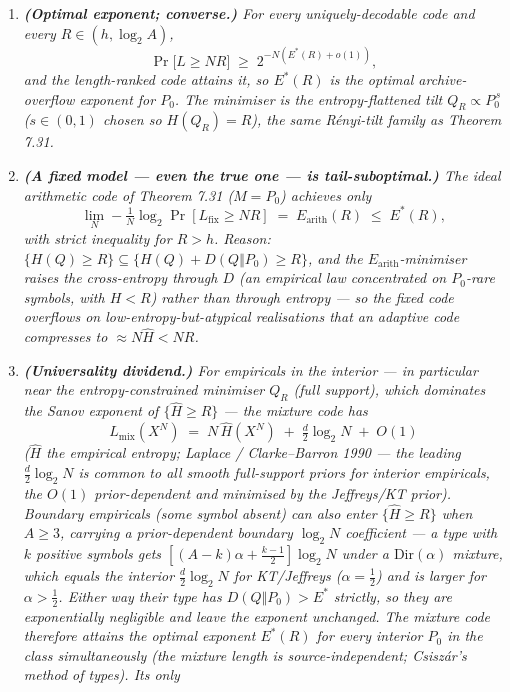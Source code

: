 \documentclass[
]{article}
\begin{document}
\begin{enumerate}
\item \emph{\textbf{(Optimal exponent; converse.)} For every uniquely-decodable code
and every $R\in(h,\log_2 A)$,}
\[
  \Pr\bigl[L\ge NR\bigr]\;\ge\;2^{-N(E^\ast(R)+o(1))},
\]
\emph{and the length-ranked code attains it, so $E^\ast(R)$ is the \emph{optimal}
archive-overflow exponent for $P_0$. The minimiser is the entropy-flattened tilt
$Q_R\propto P_0^{\,s}$ ($s\in(0,1)$ chosen so $H(Q_R)=R$), the same R\'enyi-tilt
family as Theorem 7.31.}
\item \emph{\textbf{(A fixed model --- even the true one --- is tail-suboptimal.)}
The ideal arithmetic code of Theorem 7.31 ($M=P_0$) achieves only}
\[
  \lim_N -\tfrac1N\log_2\Pr[L_{\mathrm{fix}}\ge NR]\;=\;E_{\mathrm{arith}}(R)\;\le\;E^\ast(R),
\]
\emph{with \emph{strict} inequality for $R>h$. Reason: $\{H(Q)\ge R\}\subseteq
\{H(Q)+D(Q\Vert P_0)\ge R\}$, and the $E_{\mathrm{arith}}$-minimiser raises the
cross-entropy through $D$ (an empirical law concentrated on $P_0$-\emph{rare}
symbols, with $H<R$) rather than through entropy --- so the fixed code overflows on
low-entropy-but-atypical realisations that an adaptive code compresses to
$\approx N\widehat H<NR$.}
\item \emph{\textbf{(Universality dividend.)} For empiricals in the interior --- in
particular near the entropy-constrained minimiser $Q_R$ (full support), which
\emph{dominates the Sanov exponent} of $\{\widehat H\ge R\}$ --- the mixture code has}
\[
  L_{\mathrm{mix}}(X^N)\;=\;N\,\widehat H(X^N)\;+\;\tfrac d2\log_2 N\;+\;O(1)
\]
\emph{($\widehat H$ the empirical entropy; Laplace / Clarke--Barron 1990 --- the
leading $\tfrac d2\log_2 N$ is common to all smooth full-support priors for interior
empiricals, the $O(1)$ prior-dependent and minimised by the Jeffreys/KT prior).
Boundary empiricals (some symbol absent) \emph{can} also enter $\{\widehat H\ge R\}$
when $A\ge3$, carrying a prior-dependent boundary $\log_2 N$ coefficient --- a type
with $k$ positive symbols gets $[(A-k)\alpha+\tfrac{k-1}2]\log_2 N$ under a
$\mathrm{Dir}(\alpha)$ mixture, which equals the interior $\tfrac d2\log_2 N$ for
KT/Jeffreys ($\alpha=\tfrac12$) and is larger for $\alpha>\tfrac12$. Either way their
type has $D(Q\Vert P_0)>E^\ast$ strictly, so they are exponentially negligible and
leave the exponent unchanged. The mixture code therefore attains the \emph{optimal} exponent
$E^\ast(R)$ for \emph{every} interior $P_0$ in the class simultaneously (the mixture
length is source-independent; Csisz\'ar's method of types). Its only
}
\end{enumerate}
\end{document}
